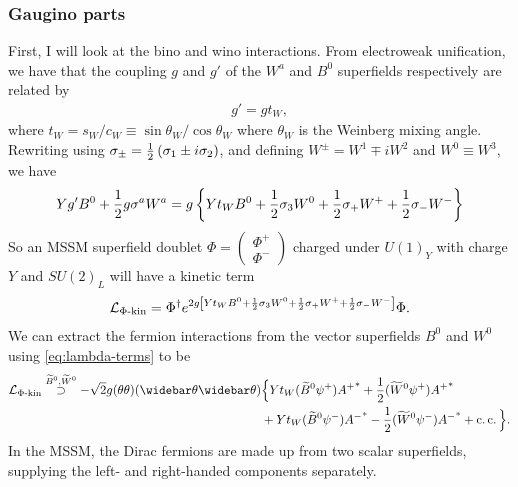 \documentclass[english, notitlepage]{article}
\begin{document}
        \subsubsection{Gaugino parts}
            First, I will look at the bino and wino interactions.
            From electroweak unification, we have that the coupling $g$ and $g'$ of the $W^a$ and $B^0$ superfields respectively are related by
            \begin{align}
                g' = g t_W,
            \end{align}
            where $t_W = s_W/c_W \equiv \sin\theta_W/\cos\theta_W$ where $\theta_W$ is the Weinberg mixing angle.
            Rewriting using $\sigma_\pm = \frac{1}{2}\left(\sigma_1 \pm i\sigma_2\right)$, and defining $W^\pm = W^1 \mp iW^2$ and $W^0 \equiv W^3$, we have
            \begin{align}
                Yg'B^0 + \frac{1}{2}g\sigma^a W^a = g\left\{ Yt_W B^0 + \frac{1}{2}\sigma_3 W^0 + \frac{1}{2}\sigma_+ W^+ + \frac{1}{2}\sigma_- W^- \right\}
            \end{align}
            So an MSSM superfield doublet $\Phi = \begin{pmatrix} \Phi^+ \\ \Phi^- \end{pmatrix}$ charged under ${U(1)}_Y$ with charge $Y$ and ${SU(2)}_L$ will have a kinetic term
            \begin{align}
                \mathcal{L}_{\Phi\text{-kin}} = \Phi^\dag e^{2g\left[ Yt_W B^0 + \frac{1}{2}\sigma_3 W^0 + \frac{1}{2}\sigma_+ W^+ + \frac{1}{2}\sigma_- W^- \right]} \Phi.
            \end{align}
            We can extract the fermion interactions from the vector superfields $B^0$ and $W^0$ using \cref{eq:lambda-terms} to be
            \begin{align}
                \nonumber
                \L_{\Phi\text{-kin}} \stackrel{\bino, \wino}{\supset} -\sqrt{2}g (\theta\theta)(\wbar\theta\wbar\theta) & \Big\{ Yt_W (\bino \psi^+) {A^+}^* + \frac{1}{2} (\wino \psi^+) {A^+}^*      \\
                \label{eq:gaugino_doublet_interaction}
                                                                                                                        & + Yt_W (\bino\psi^-){A^-}^* -\frac{1}{2} (\wino \psi^-){A^-}^* + \cc \Big\}.
            \end{align}
            In the MSSM, the Dirac fermions are made up from two scalar superfields, supplying the left- and right-handed components separately.
\end{document}
